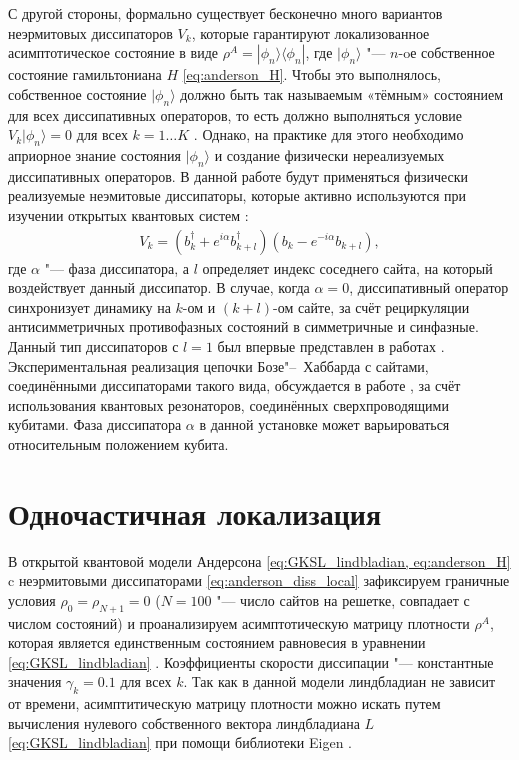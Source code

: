 С другой стороны, формально существует бесконечно много вариантов неэрмитовых диссипаторов \(V_k\), которые гарантируют локализованное асимптотическое состояние в виде \(\rho^A = | \phi_n \rangle \langle \phi_n |\), где \(| \phi_n \rangle\) "--- \(n\)-oе собственное состояние гамильтониана \(H\) \cref{eq:anderson_H}. 
Чтобы это выполнялось, собственное состояние \(| \phi_n \rangle\) должно быть так называемым «тёмным» состоянием для всех диссипативных операторов, то есть должно выполняться условие \(V_k | \phi_n \rangle = 0\) для всех \(k=1 \ldots K\) \cite{Diehl2008, Kraus2008}. 
Однако, на практике для этого необходимо априорное знание состояния \(| \phi_n \rangle\) и создание физически нереализуемых диссипативных операторов.
В данной работе будут применяться физически реализуемые неэмитовые диссипаторы, которые активно используются при изучении открытых квантовых систем \cite{Diehl2008, Kraus2008, Bardyn2013, Barreiro2010, Kienzler2014, Vorberg2013}:
\begin{equation}
	\label{eq:anderson_diss_local}
	\begin{gathered}
		V_k = \left( b^\dagger_k + e^{i \alpha} b^\dagger_{k+l}\right) \left( b_k - e^{-i \alpha} b_{k+l} \right),
	\end{gathered}
\end{equation}
где \(\alpha\) "--- фаза диссипатора, а \(l\) определяет индекс соседнего сайта, на который воздействует данный диссипатор. 
В случае, когда \(\alpha = 0\), диссипативный оператор синхронизует динамику на \(k\)-ом и \((k+l)\)-ом сайте, за счёт рециркуляции антисимметричных противофазных состояний в симметричные и синфазные. 
Данный тип диссипаторов с \(l=1\) был впервые представлен в работах \cite{Diehl2008, Kraus2008}.
Экспериментальная реализация цепочки Бозе"--~Хаббарда с сайтами, соединёнными диссипаторами такого вида, обсуждается в работе \cite{Marcos2012}, за счёт использования квантовых резонаторов, соединённых сверхпроводящими кубитами.
Фаза диссипатора \(\alpha\) в данной установке может варьироваться относительным положением кубита.


\section{Одночастичная локализация}\label{sec:ch2/prl}

В открытой квантовой модели Андерсона \cref{eq:GKSL_lindbladian, eq:anderson_H} c неэрмитовыми диссипаторами \cref{eq:anderson_diss_local} зафиксируем граничные условия \(\rho_0 = \rho_{N+1} = 0\) (\(N = 100\) "--- число сайтов на решетке, совпадает с числом состояний) и проанализируем асимптотическую матрицу плотности \(\rho^A\), которая является единственным состоянием равновесия в уравнении \cref{eq:GKSL_lindbladian} \cite{book2007, Albert2014}. Коэффициенты скорости диссипации "--- константные значения \(\gamma_k = 0.1\) для всех \(k\).
Так как в данной модели линдбладиан не зависит от времени, асимптитическую матрицу плотности можно искать путем вычисления нулевого собственного вектора линдбладиана \(L\) \cref{eq:GKSL_lindbladian} при помощи библиотеки Eigen \cite{eigenweb}.

